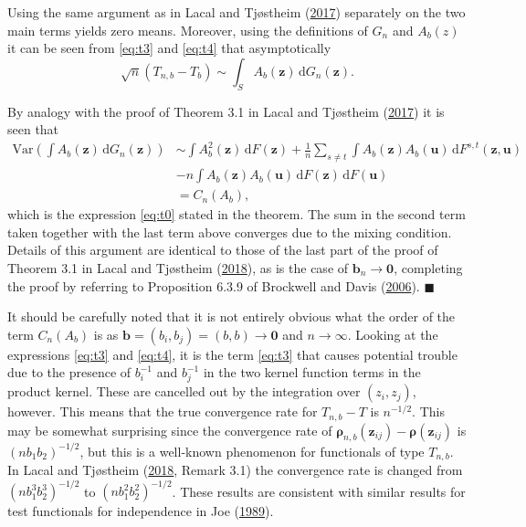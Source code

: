 \documentclass[
  12pt,
  letterpaper]{article}
\numberwithin{equation}{section}
\newcommand{\z}{\bm{z}}
\newcommand{\fu}{\bm{u}}
\newcommand{\frho}{\bm{\rho}}
\newcommand{\bb}{\bm{b}}
\newcommand{\Var}{\textrm{Var}}
\newcommand{\di}{\,\textrm{d}}
\begin{document}
Using the same argument as in Lacal and Tjøstheim (\protect\hyperlink{ref-lacal2017local}{2017}) separately on the two main terms yields zero means. Moreover, using the definitions of \(G_n\) and \(A_b(z)\) it can be seen from \eqref{eq:t3} and \eqref{eq:t4} that asymptotically
\[
\sqrt{n}\left(T_{n,b} - T_b\right) \sim \int_S A_b(\z) \di G_n(\z).
\]

By analogy with the proof of Theorem 3.1 in Lacal and Tjøstheim (\protect\hyperlink{ref-lacal2017local}{2017}) it is seen that
\begin{align*}
\Var\left(\int A_b(\z) \di G_n(\z)\right) &\sim \int A_b^2(\z) \di F(\z) + \frac{1}{n}\sum_{s \neq t} \int A_b(\z)A_b(\fu) \di F^{s,t}(\z,\fu) \\ 
& - n\int A_b(\z)A_b(\fu) \di F(\z)\di F(\fu) \\
& = C_n(A_b),
\end{align*}
which is the expression \eqref{eq:t0} stated in the theorem. The sum in the second term taken together with the last term above converges due to the mixing condition. Details of this argument are identical to those of the last part of the proof of Theorem 3.1 in Lacal and Tjøstheim (\protect\hyperlink{ref-lacal2018estimating}{2018}), as is the case of \(\bb_n \rightarrow \bm{0}\), completing the proof by referring to Proposition 6.3.9 of Brockwell and Davis (\protect\hyperlink{ref-brockwell1991time}{2006}). \(\blacksquare\)

It should be carefully noted that it is not entirely obvious what the order of the term \(C_n(A_b)\) is as \(\bb = (b_i,b_j) = (b,b) \to \bm{0}\) and \(n \to \infty\). Looking at the expressions \eqref{eq:t3} and \eqref{eq:t4}, it is the term \eqref{eq:t3} that causes potential trouble due to the presence of \(b_i^{-1}\) and \(b_j^{-1}\) in the two kernel function terms in the product kernel. These are cancelled out by the integration over \((z_i,z_j)\), however. This means that the true convergence rate for \(T_{n,b}-T\) is \(n^{-1/2}\). This may be somewhat surprising since the convergence rate of \(\frho_{n,b}(\z_{ij})-\frho(\z_{ij})\) is \((nb_1b_2)^{-1/2}\), but this is a well-known phenomenon for functionals of type \(T_{n,b}\). In Lacal and Tjøstheim (\protect\hyperlink{ref-lacal2018estimating}{2018}, Remark 3.1) the convergence rate is changed from \((nb_1^3b_2^3)^{-1/2}\) to \((nb_1^2b_2^2)^{-1/2}\). These results are consistent with similar results for test functionals for independence in Joe (\protect\hyperlink{ref-joe1989estimation}{1989}).
\end{document}
